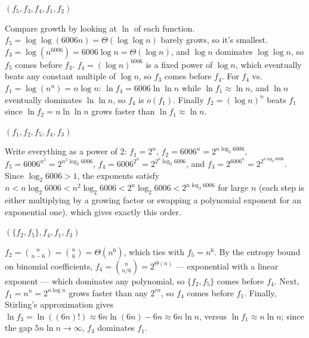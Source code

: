 \documentclass[12pt,twoside]{article}
\begin{document}


\begin{problems}

\problem  %

\begin{problemparts}

\problempart %
$(f_5, f_3, f_4, f_1, f_2)$

Compare growth by looking at $\ln$ of each function. $f_5 = \log\log(6006n) = \Theta(\log\log n)$
barely grows, so it's smallest. $f_3 = \log(n^{6006}) = 6006\log n = \Theta(\log n)$, and $\log n$
dominates $\log\log n$, so $f_5$ comes before $f_3$. $f_4 = (\log n)^{6006}$ is a fixed power of
$\log n$, which eventually beats any constant multiple of $\log n$, so $f_3$ comes before $f_4$.
For $f_4$ vs.\ $f_1 = \log(n^n) = n\log n$: $\ln f_4 = 6006\ln\ln n$ while $\ln f_1 \approx \ln n$,
and $\ln n$ eventually dominates $\ln\ln n$, so $f_4$ is $o(f_1)$. Finally $f_2 = (\log n)^n$ beats
$f_1$ since $\ln f_2 = n\ln\ln n$ grows faster than $\ln f_1 \approx \ln n$.

\problempart %
$(f_1, f_2, f_5, f_4, f_3)$

Write everything as a power of 2: $f_1 = 2^n$, $f_2 = 6006^n = 2^{n\log_2 6006}$,
$f_5 = 6006^{n^2} = 2^{n^2\log_2 6006}$, $f_4 = 6006^{2^n} = 2^{2^n\log_2 6006}$, and
$f_3 = 2^{6006^n} = 2^{2^{n\log_2 6006}}$. Since $\log_2 6006 > 1$, the exponents satisfy
$n < n\log_2 6006 < n^2\log_2 6006 < 2^n\log_2 6006 < 2^{n\log_2 6006}$ for large $n$
(each step is either multiplying by a growing factor or swapping a polynomial exponent for
an exponential one), which gives exactly this order.

\problempart %
$(\{f_2, f_5\}, f_4, f_1, f_3)$

$f_2 = \binom{n}{n-6} = \binom{n}{6} = \Theta(n^6)$, which ties with $f_5 = n^6$. By the
entropy bound on binomial coefficients, $f_4 = \binom{n}{n/6} = 2^{\Theta(n)}$ --- exponential
with a linear exponent --- which dominates any polynomial, so $\{f_2,f_5\}$ comes before $f_4$.
Next, $f_1 = n^n = 2^{n\log n}$ grows faster than any $2^{cn}$, so $f_4$ comes before $f_1$.
Finally, Stirling's approximation gives $\ln f_3 = \ln((6n)!) \approx 6n\ln(6n) - 6n \approx
6n\ln n$, versus $\ln f_1 \approx n\ln n$; since the gap $5n\ln n \to \infty$, $f_3$ dominates $f_1$.


\end{problemparts}
\end{problems}
\end{document}

